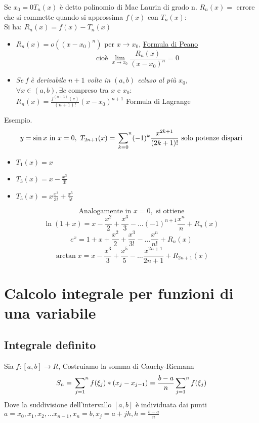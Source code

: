 Se $x_0=0T_n(x)$ è detto polinomio di Mac Laurin di grado n. $R_n(x)=$ errore
che si commette quando si approssima $f(x)$ con $T_n(x)$:\\
Si ha: $R_n(x)=f(x)-T_n(x)$
\begin{itemize}
	\item $R_n(x)=o((x-x_0)^n)$ per $x\to x_0$, \underline{Formula di Peano}
		\begin{equation*}
			\text{cioè }\lim_{x\to x_0}\frac{R_n(x)}{(x-x_0)^n}=0
		\end{equation*}
	\item \textit{Se f è derivabile $n+1$ volte in $(a,b)$ ecluso al più
		$x_0$,}\\
		$\forall x\in(a,b), \exists c$ compreso tra $x$ e $x_0$:\\
		$R_n(x)=\frac{f^{(n+1)}(c)}{(n+1)!}(x-x_0)^{n+1}$ Formula di Lagrange
\end{itemize}
Esempio.
\begin{equation*}
	y=\sin x \text{ in } x=0,\text{ }T_{2n+1}(x)=\sideset{}{^n}\sum_{k=0}(-1)^k \frac{x^{2k+1}}{(2k+1)!} \text{ solo potenze dispari}
\end{equation*}
\begin{itemize}
	\item $T_1(x)=x$
	\item $T_3(x)=x-\frac{x^3}{3!}$
	\item $T_5(x)=x\frac{x^3}{3!}+\frac{x^5}{5!}$
\end{itemize}
\begin{equation*}
	\text{Analogamente in } x=0,\text{ si ottiene}
\end{equation*}
\begin{equation*}
	\ln(1+x)=x-\frac{x^2}{2}+\frac{x^3}{3}-\dots (-1)^{n+1}\frac{x^{n}}{n}+R_n(x)
\end{equation*}
\begin{equation*}
	e^x=1+x+\frac{x^2}{2}+\frac{x^3}{3!}-\dots\frac{x^{n}}{n!}+R_n(x)
\end{equation*}
\begin{equation*}
	\arctan x = x-\frac{x^3}{3}+\frac{x^5}{5}-\dots\frac{x^{2n+1}}{2n+1}+R_{2n+1}(x)
\end{equation*}

\section{Calcolo integrale per funzioni di una variabile}
\subsection{Integrale definito}
Sia $f:[a,b]\to R$, 
Costruiamo la somma di Cauchy-Riemann
\begin{equation*}
	S_n= \sideset{}{^n}\sum_{j=1}f(\xi_j)*(x_j-x_{j-1})=\frac{b-a}{n}\sideset{}{^n}\sum_{j=1}f(\xi_j)
\end{equation*}
Dove la suddivisione dell'intervallo $[a,b]$ è individuata dai punti $a=x_0,x_1,x_2,\dots x_{n-1},x_n=b, x_j=a+jh, h=\frac{b-a}{n}$
